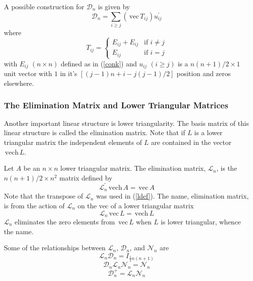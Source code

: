 \documentclass[12pt,thmsa,suthesis,verbatim]{report}
\begin{document}
A possible construction for $\mathcal{D}_n$ is given by 
\[
\mathcal{D}_n=\sum_{i\geq j}\left( \,\mathrm{vec}\,T_{ij}\right)
u_{ij}^{\prime } 
\]
where 
\begin{equation}
T_{ij}=\left\{ 
\begin{array}{ll}
E_{ij}+E_{ij} & \text{if }i\neq j \\ 
E_{ij} & \text{if }i=j
\end{array}
\right.  \label{tijdef}
\end{equation}
with $E_{ij}$ $\left( n\times n\right) $ defined as in (\ref{conk}) and $%
u_{ij}$ $\left( i\geq j\right) $ is a $n(n+1)/2\times 1$ unit vector with $1$
in it's $\left[ \left( j-1\right) n+i-j\left( j-1\right) /2\right] $
position and zeros elsewhere.

\subsubsection{The Elimination Matrix and Lower Triangular Matrices}

Another important linear structure is lower triangularity. The basis matrix
of this linear structure is called the elimination matrix. Note that if $L$
is a lower triangular matrix the independent elements of $L$ are contained
in the vector $\,\mathrm{vech}\,L$.

Let $A$ be an $n\times n$ lower triangular matrix. The elimination matrix, $%
\mathcal{L}_n$, is the $n\left( n+1\right) /2\times n^2$ matrix defined by 
\begin{equation}
\mathcal{L}_n^{\prime }\,\mathrm{vech}\,A=\,\mathrm{vec}\,A  \label{ldef}
\end{equation}
Note that the transpose of $\mathcal{L}_n$ was used in (\ref{ldef}). The
name, elimination matrix, is from the action of $\mathcal{L}_n$ on the vec
of a lower triangular matrix 
\begin{equation}
\mathcal{L}_n\,\mathrm{vec}\,L=\,\mathrm{vech}\,L
\end{equation}
$\mathcal{L}_n$ eliminates the zero elements from $\,\mathrm{vec}\,L$ when $%
L $ is lower triangular, whence the name.

Some of the relationships between $\mathcal{L}_n$, $\mathcal{D}_n$, and $%
\mathcal{N}_n$ are 
\begin{equation}
\mathcal{L}_n\mathcal{D}_n=I_{\frac 12n\left( n+1\right) }
\end{equation}
\begin{equation}
\mathcal{D}_n\mathcal{L}_n\mathcal{N}_n=\mathcal{N}_n
\end{equation}
\begin{equation}
\mathcal{D}_n^{+}=\mathcal{L}_n\mathcal{N}_n
\end{equation}
\end{document}
